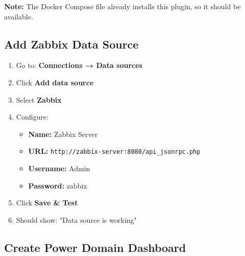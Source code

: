 \documentclass[12pt,a4paper]{report}
\begin{document}
\textbf{Note:} The Docker Compose file already installs this plugin, so it should be available.

\subsection{Add Zabbix Data Source}

\begin{enumerate}
    \item Go to: \textbf{Connections → Data sources}
    \item Click \textbf{Add data source}
    \item Select \textbf{Zabbix}
    \item Configure:
    \begin{itemize}
        \item \textbf{Name:} Zabbix Server
        \item \textbf{URL:} \texttt{http://zabbix-server:8080/api\_jsonrpc.php}
        \item \textbf{Username:} Admin
        \item \textbf{Password:} zabbix
    \end{itemize}
    \item Click \textbf{Save \& Test}
    \item Should show: "Data source is working"
\end{enumerate}



\subsection{Create Power Domain Dashboard}
\end{document}
